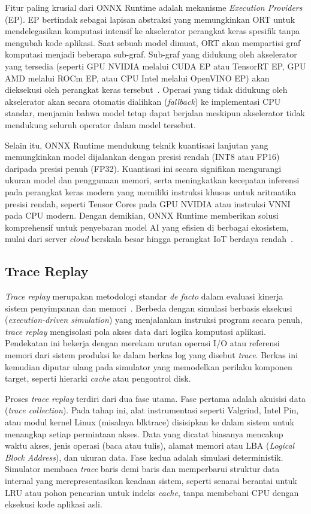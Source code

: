 Fitur paling krusial dari ONNX Runtime adalah mekanisme \textit{Execution
Providers} (EP). EP bertindak sebagai lapisan abstraksi yang memungkinkan
ORT untuk mendelegasikan komputasi intensif ke akselerator perangkat keras
spesifik tanpa mengubah kode aplikasi. Saat sebuah model dimuat, ORT
akan mempartisi graf komputasi menjadi beberapa sub-graf. Sub-graf yang
didukung oleh akselerator yang tersedia (seperti GPU NVIDIA melalui CUDA
  EP atau TensorRT EP, GPU AMD melalui ROCm EP, atau CPU Intel melalui
OpenVINO EP) akan dieksekusi oleh perangkat keras
tersebut~\cite{Tian2020Compiling}.
Operasi yang tidak didukung oleh akselerator akan secara otomatis dialihkan
(\textit{fallback}) ke implementasi CPU standar, menjamin bahwa model tetap
dapat berjalan meskipun akselerator tidak mendukung seluruh operator dalam
model tersebut.

Selain itu, ONNX Runtime mendukung teknik kuantisasi lanjutan yang
memungkinkan model dijalankan dengan presisi rendah (INT8 atau FP16)
daripada presisi penuh (FP32). Kuantisasi ini secara signifikan mengurangi
ukuran model dan penggunaan memori, serta meningkatkan kecepatan inferensi
pada perangkat keras modern yang memiliki instruksi khusus untuk aritmatika
presisi rendah, seperti Tensor Cores pada GPU NVIDIA atau instruksi VNNI
pada CPU modern. Dengan demikian, ONNX Runtime memberikan solusi
komprehensif untuk penyebaran model AI yang efisien di berbagai ekosistem,
mulai dari server \textit{cloud} berskala besar hingga perangkat IoT berdaya
rendah~\cite{Jajal2024Interoperability}.

\subsection{Trace Replay}
\textit{Trace replay} merupakan metodologi standar \textit{de facto} dalam
evaluasi kinerja sistem penyimpanan dan memori~\cite{Yang2021A}.
Berbeda dengan simulasi berbasis eksekusi (\textit{execution-driven simulation})
yang menjalankan instruksi program secara penuh, \textit{trace replay}
mengisolasi pola akses data dari logika komputasi aplikasi.
Pendekatan ini bekerja dengan merekam urutan operasi I/O atau referensi memori
dari sistem produksi ke dalam berkas log yang disebut \textit{trace}.
Berkas ini kemudian diputar ulang pada simulator yang memodelkan
perilaku komponen target, seperti hierarki \textit{cache} atau pengontrol disk.

Proses \textit{trace replay} terdiri dari dua fase utama.
Fase pertama adalah akuisisi data (\textit{trace collection}).
Pada tahap ini, alat instrumentasi seperti Valgrind, Intel Pin, atau
modul kernel Linux (misalnya blktrace) disisipkan ke dalam sistem
untuk menangkap setiap permintaan akses. Data yang dicatat biasanya mencakup
waktu akses, jenis operasi (baca atau tulis), alamat memori atau LBA
(\textit{Logical Block Address}), dan ukuran data.
Fase kedua adalah simulasi deterministik. Simulator membaca \textit{trace}
baris demi baris dan memperbarui struktur data internal yang merepresentasikan
keadaan sistem, seperti senarai berantai untuk LRU atau pohon pencarian
untuk indeks \textit{cache}, tanpa membebani CPU dengan eksekusi kode
aplikasi asli.


